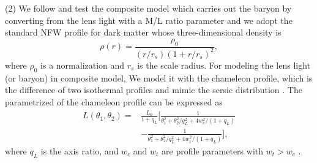 \documentclass[useAMS,usenatbib]{mnras}
\newcommand{\sref}[1]{Section~\ref{#1}}
\begin{document}
(2) We follow \citet{SuyuEtal14} and test the composite model which carries out the baryon by converting from the lens light with a M/L ratio parameter and 
we adopt the standard NFW profile \citep{NavarroEtal96} for dark matter whose three-dimensional density is 
\begin{equation}
\rho(r)=\frac{\rho_{0}}{(r/r_{s})(1+r/r_{s})^2},
\end{equation}
where $\rho_{0}$ is a normalization and $r_{s}$ is the scale radius. For modeling the lens light (or baryon) in composite model, We model it with the chameleon profile, which is the difference of two isothermal profiles and mimic the sersic distribution \citep{DuttonEtal11}. The parametrized of the chameleon profile can be expressed as 
\begin{equation}
\label{eq:chameleon}
\begin{split}
L(\theta_{1},\theta_{2})=&\frac{L_{0}}{1+q_{L}}[\frac{1}{\theta_{1}^2+\theta_{2}^2/q_{L}^2+4w_{c}^2/(1+q_{L})}\\
&-\frac{1}{\theta_{1}^2+\theta_{2}^2/q_{L}^2+4w_{t}^2/(1+q_{L})}],
\end{split}
\end{equation}
where $q_{L}$ is the axis ratio, and $w_{c}$ and $w_{t}$ are profile parameters with $w_{t}>w_{c}$ \citep{SuyuEtal14}. 
\end{document}
